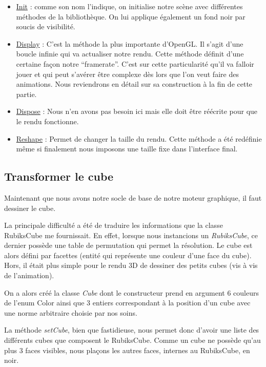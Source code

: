 \begin{itemize}
    \item \underline{Init} : comme son nom l’indique, on initialise notre scène avec différentes méthodes de la bibliothèque. On lui applique également un fond noir par soucis de visibilité.

    \item \underline{Display} : C’est la méthode la plus importante d’OpenGL. Il s’agit d’une boucle infinie qui va actualiser notre rendu. Cette méthode définit d’une certaine façon notre “framerate”.
C’est sur cette particularité qu’il va falloir jouer et qui peut s’avérer être complexe dès lors que l’on veut faire des animations. Nous reviendrons en détail sur sa construction à la fin de cette partie.

\item \underline{Dispose}  : Nous n’en avons pas besoin ici mais elle doit être réécrite pour que le rendu fonctionne.

\item \underline{Reshape} : Permet de changer la taille du rendu. Cette méthode a été redéfinie même si finalement nous imposons une taille fixe dans l’interface final.

\end{itemize}

\subsection{Transformer le cube}
Maintenant que nous avons notre socle de base de notre moteur graphique, il faut dessiner le cube.

La principale difficulté a été de traduire les informations que la classe RubiksCube me fournissait.
En effet, lorsque nous instancions un \textit{RubiksCube}, ce dernier possède une table de permutation qui permet la résolution. 
Le cube est alors défini par facettes (entité qui représente une couleur d’une face du cube). 
Hors, il était plus simple pour le rendu 3D de dessiner des petits cubes (vis à vis de l’animation).

On a alors créé la classe \textit{Cube} dont le constructeur prend en argument 6 couleurs de l’enum Color ainsi que 3 entiers correspondant à la position d’un cube avec une norme arbitraire choisie par nos soins.

La méthode \textit{setCube}, bien que fastidieuse, nous permet donc d’avoir une liste des différents cubes que composent le RubiksCube. Comme un cube ne possède qu’au plus 3 faces visibles, nous plaçons les autres faces, internes au RubiksCube, en noir.


